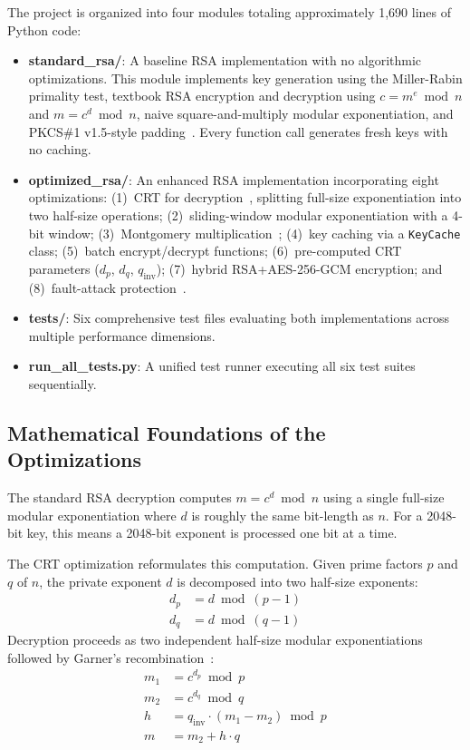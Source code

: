 \documentclass[conference]{IEEEtran}
\begin{document}
The project is organized into four modules totaling approximately 1,690 lines of Python code:

\begin{itemize}
    \item \textbf{standard\_rsa/}: A baseline RSA implementation with no algorithmic optimizations. This module implements key generation using the Miller-Rabin primality test, textbook RSA encryption and decryption using $c = m^e \bmod n$ and $m = c^d \bmod n$, naive square-and-multiply modular exponentiation, and PKCS\#1 v1.5-style padding~\cite{pkcs1_2016}. Every function call generates fresh keys with no caching.

    \item \textbf{optimized\_rsa/}: An enhanced RSA implementation incorporating eight optimizations: (1)~CRT for decryption~\cite{garner1959}, splitting full-size exponentiation into two half-size operations; (2)~sliding-window modular exponentiation with a 4-bit window; (3)~Montgomery multiplication~\cite{montgomery1985}; (4)~key caching via a \texttt{KeyCache} class; (5)~batch encrypt/decrypt functions; (6)~pre-computed CRT parameters ($d_p$, $d_q$, $q_{\mathrm{inv}}$); (7)~hybrid RSA+AES-256-GCM encryption; and (8)~fault-attack protection~\cite{boneh2001}.

    \item \textbf{tests/}: Six comprehensive test files evaluating both implementations across multiple performance dimensions.

    \item \textbf{run\_all\_tests.py}: A unified test runner executing all six test suites sequentially.
\end{itemize}

\subsection{Mathematical Foundations of the Optimizations}

The standard RSA decryption computes $m = c^d \bmod n$ using a single full-size modular exponentiation where $d$ is roughly the same bit-length as $n$. For a 2048-bit key, this means a 2048-bit exponent is processed one bit at a time.

The CRT optimization reformulates this computation. Given prime factors $p$ and $q$ of $n$, the private exponent $d$ is decomposed into two half-size exponents:
\begin{align}
    d_p &= d \bmod (p - 1) \label{eq:dp} \\
    d_q &= d \bmod (q - 1) \label{eq:dq}
\end{align}
Decryption proceeds as two independent half-size modular exponentiations followed by Garner's recombination~\cite{garner1959}:
\begin{align}
    m_1 &= c^{d_p} \bmod p \label{eq:m1} \\
    m_2 &= c^{d_q} \bmod q \label{eq:m2} \\
    h &= q_{\mathrm{inv}} \cdot (m_1 - m_2) \bmod p \label{eq:h} \\
    m &= m_2 + h \cdot q \label{eq:m}
\end{align}
\end{document}
